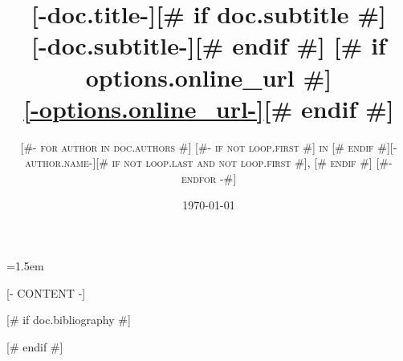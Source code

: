 \documentclass[a4paper,11pt,oneside]{book}
\title{\Huge \textbf{[-doc.title-]}[# if doc.subtitle #] \\[1ex] \huge [-doc.subtitle-][# endif #]%
[# if options.online_url #]\\[3ex] \normalsize \url{[-options.online_url-]}[# endif #]}
\author{\textsc{
[#- for author in doc.authors #]
  [#- if not loop.first #] in [# endif #][-author.name-][# if not loop.last and not loop.first #], [# endif #]
[#- endfor -#]
}}
\date{\today}
\numberwithin{equation}{chapter}
\begin{document}
\sloppy
\emergencystretch=1.5em

\frontmatter
\maketitle
\tableofcontents

\mainmatter
\setcounter{chapter}{[-options.first_chapter-]}
\addtocounter{chapter}{-1}

[- CONTENT -]

[# if doc.bibliography #]

[# endif #]
\end{document}
